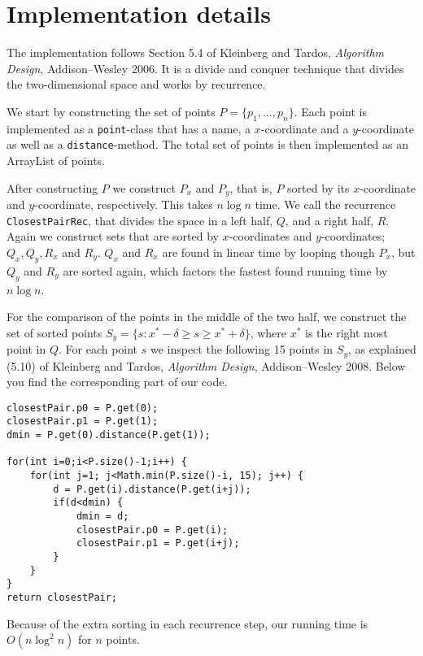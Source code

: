 \documentclass{tufte-handout}
\begin{document}
  \section{Implementation details}
The implementation follows Section 5.4 of Kleinberg and Tardos, \emph{Algorithm Design}, Addison--Wesley 2006. It is a divide and conquer technique that divides the two-dimensional space and works by recurrence. 

We start by constructing the set of points $P=\{ p_1, ..., p_n\}$. Each point is implemented as a \verb#point#-class that has a name, a $x$-coordinate and a $y$-coordinate as well as a \verb#distance#-method. The total set of points is then implemented as an ArrayList of points.

After constructing $P$ we construct $P_x$ and $P_y$, that is, $P$ sorted by its $x$-coordinate and $y$-coordinate, respectively. This takes $n\log n$ time. We call the recurrence \verb#ClosestPairRec#, that divides the space in a left half, $Q$, and a right half, $R$. Again we construct sets that are sorted by $x$-coordinates and $y$-coordinates; $Q_x, Q_y, R_x$ and $R_y$. $Q_x$ and $R_x$ are found in linear time by looping though $P_x$, but $Q_y$ and $R_y$ are sorted again, which factors the fastest found running time by $n\log n$. 

For the comparison of the points in the middle of the two half, we construct the set of sorted points $S_y= \{s: x^*-\delta \ge s \ge x^*+\delta\}$, where $x^*$ is the right most point in $Q$. For each point $s$ we inspect the following 15 points in $S_y$, as explained (5.10) of Kleinberg and Tardos, \emph{Algorithm Design}, Addison--Wesley 2008. Below you find the corresponding part of our code. 
\begin{verbatim}
closestPair.p0 = P.get(0);
closestPair.p1 = P.get(1);
dmin = P.get(0).distance(P.get(1));

for(int i=0;i<P.size()-1;i++) {
    for(int j=1; j<Math.min(P.size()-i, 15); j++) {
        d = P.get(i).distance(P.get(i+j));
        if(d<dmin) {
            dmin = d;
            closestPair.p0 = P.get(i);
            closestPair.p1 = P.get(i+j);
        }
    }
}
return closestPair;
  \end{verbatim}
Because of the extra sorting in each recurrence step, our running time is $O(n\log^{2} n)$ for $n$ points.
\end{document}
